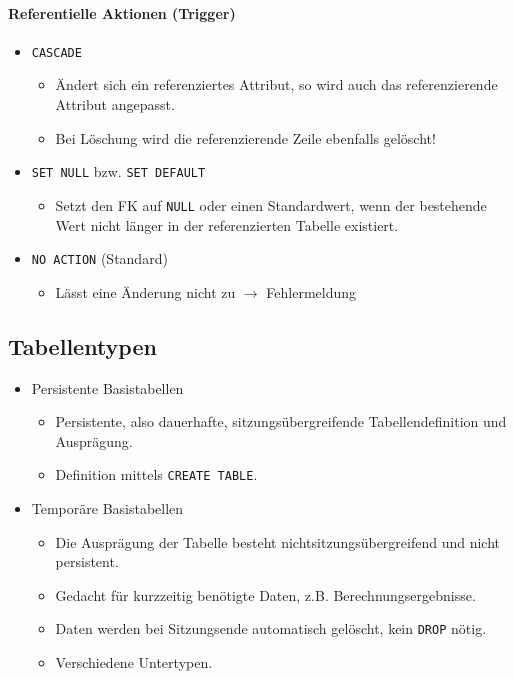 				\paragraph{Referentielle Aktionen (Trigger)}
					\begin{itemize}
						\item \lstinline|CASCADE|
							\begin{itemize}
								\item Ändert sich ein referenziertes Attribut, so wird auch das referenzierende Attribut angepasst.
								\item Bei Löschung wird die referenzierende Zeile ebenfalls gelöscht!
							\end{itemize}
						\item \lstinline|SET NULL| bzw. \lstinline|SET DEFAULT|
							\begin{itemize}
								\item Setzt den FK auf \lstinline|NULL| oder einen Standardwert, wenn der bestehende Wert nicht länger in der referenzierten Tabelle existiert.
							\end{itemize}
						\item \lstinline|NO ACTION| (Standard)
							\begin{itemize}
								\item Lässt eine Änderung nicht zu \(\rightarrow\) Fehlermeldung
							\end{itemize}
					\end{itemize}

		\subsection{Tabellentypen} %
			\begin{itemize}
				\item Persistente Basistabellen
					\begin{itemize}
						\item Persistente, also dauerhafte, sitzungsübergreifende Tabellendefinition und Ausprägung.
						\item Definition mittels \lstinline|CREATE TABLE|.
					\end{itemize}
				\item Temporäre Basistabellen
					\begin{itemize}
						\item Die Ausprägung der Tabelle besteht nichtsitzungsübergreifend und nicht persistent.
						\item Gedacht für kurzzeitig benötigte Daten, z.B. Berechnungsergebnisse.
						\item Daten werden bei Sitzungsende automatisch gelöscht, kein \lstinline|DROP| nötig.
						\item Verschiedene Untertypen.
					\end{itemize}
			\end{itemize}

